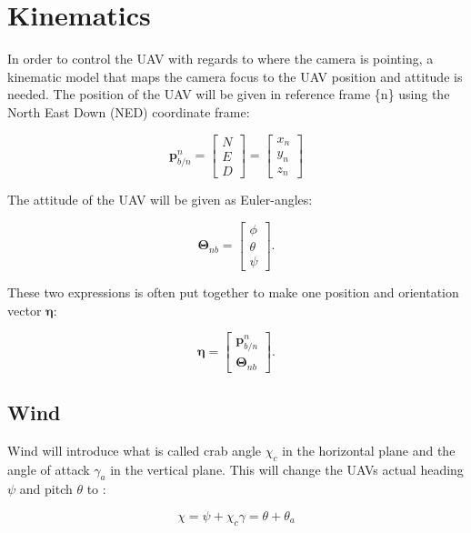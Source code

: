 \section{Kinematics}
In order to control the UAV with regards to where the camera is pointing, a kinematic model that maps the camera focus to the UAV position and attitude is needed. The position of the UAV will be given in reference frame \{n\} using the North East Down (NED) coordinate frame:

\begin{equation}
	\bm{p}_{b/n}^n =
	\begin{bmatrix}
		N \\ E \\ D
	\end{bmatrix}
	=
	\begin{bmatrix}
		x_n \\ y_n \\ z_n
	\end{bmatrix}
\end{equation}

The attitude of the UAV will be given as Euler-angles:

\begin{equation}
	\bm{\Theta}_{nb} = 
	\begin{bmatrix}
		\phi \\ \theta \\ \psi
	\end{bmatrix}.
\end{equation}
	
These two expressions is often put together to make one position and orientation vector $\bm{\eta}$:

\begin{equation}
	\bm{\eta} =
	\begin{bmatrix}
		\bm{p}_{b/n}^n \\
		\bm{\Theta}_{nb}
	\end{bmatrix}.
\end{equation}
	
\subsection{Wind}
Wind will introduce what is called crab angle $\chi_c$ in the horizontal plane and the angle of attack $\gamma_a$ in the vertical plane. This will change the UAVs actual heading $\psi$ and pitch $\theta$ to \cite{suaBEARD}:

\begin{subequations}
\begin{equation}
	\chi = \psi + \chi_c
\end{equation}
\begin{equation}
	\gamma = \theta + \theta_a
\end{equation}
\end{subequations}

